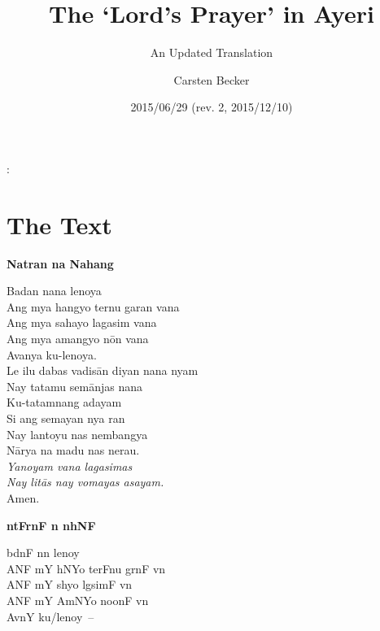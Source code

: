 \documentclass[12pt,paper=a4]{scrartcl}
\author{Carsten Becker}
\title{The ‘Lord's Prayer’ in Ayeri}
\subtitle{An Updated Translation}
\date{2015/06/29 (rev. 2, 2015/12/10)} %
\newenvironment{ayeri}{
    \Tagati
}{
}
\newenvironment{mytitle}{
    \hfill
    \begin{minipage}{0.667\textwidth}
	\vspace{\baselineskip}
	\begin{center}
	    \Large
	    \sffamily\bfseries
	    \makeatletter
}{
	    \makeatother
	\end{center}
	\vspace{1em}
    \end{minipage}
    \hfill
}
\begin{document}

\begin{mytitle}
    \@title: \\
    \@subtitle
\end{mytitle}

\section{The Text}
\begin{raggedright}
\begin{multicols}{2}
\textbf{Natran na Nahang} \\ [0.5\baselineskip]

\begin{linenumbers*}

Badan nana lenoya \\
Ang mya hangyo ternu garan vana \\
Ang mya sahayo lagasim vana \\
Ang mya amangyo nōn vana \\
Avanya ku-lenoya. \\ [0.5\baselineskip]

Le ilu dabas vadisān diyan nana nyam \\
Nay tatamu semānjas nana \\
Ku-tatamnang adayam \\
Si ang semayan nya ran \\
Nay lantoyu nas nembangya \\
Nārya na madu nas nerau. \\ [0.5\baselineskip]

\textit{Yanoyam vana lagasimas \\
Nay litās nay vomayas asayam.} \\ [0.5\baselineskip]

Amen.

\end{linenumbers*}

\columnbreak

\begin{ayeri}
\textbf{ntFrnF n nhNF} \\ [0.5\baselineskip]

\begin{linenumbers*}

bdnF nn lenoy \\
ANF mY hNYo terFnu grnF vn \\
ANF mY shyo lgsimF vn \\
ANF mY AmNYo noonF vn \\
AvnY ku/lenoy~– \\ [0.5\baselineskip]


\end{linenumbers*}
\end{ayeri}
\end{multicols}
\end{raggedright}
\end{document}
